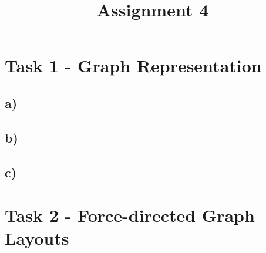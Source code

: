 \documentclass[a4paper]{article}
\date{}
\author{}
\title{\textbf{Assignment 4}}
\begin{document}
\maketitle 
\thispagestyle{fancy}

\section*{Task 1 - Graph Representation}
\subsection*{a)}
\subsection*{b)}
\subsection*{c)}

\section*{Task 2 - Force-directed Graph Layouts}
\end{document}
